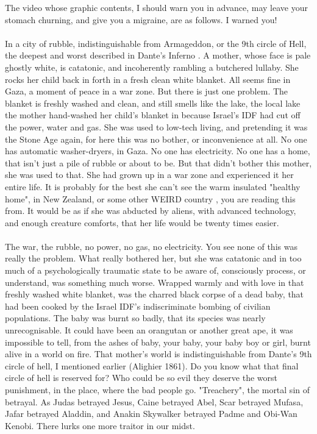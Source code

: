 \documentclass[16pt,openany,oneside]{book}
\begin{document}
The video whose graphic contents, I should warn you in advance, may leave your stomach churning, and give you a migraine, are as follows. I warned you!
\\\\
In a city of rubble, indistinguishable from Armageddon, or the 9th circle of Hell, the deepest and worst described in Dante's Inferno \cite{dante1861inferno}. A mother, whose face is pale ghostly white, is catatonic, and incoherently rambling a butchered lullaby. She rocks her child back in forth in a fresh clean white blanket. All seems fine in Gaza, a moment of peace in a war zone. But there is just one problem. The blanket is freshly washed and clean, and still smells like the lake, the local lake the mother hand-washed her child's blanket in because Israel's IDF had cut off the power, water and gas. She was used to low-tech living, and pretending it was the Stone Age again, for here this was no bother, or inconvenience at all. No one has automatic washer-dryers, in Gaza. No one has electricity. No one has a home, that isn't just a pile of rubble or about to be. But that didn't bother this mother, she was used to that. She had grown up in a war zone and experienced it her entire life. It is probably for the best she can't see the warm insulated "healthy home", in New Zealand, or some other WEIRD country \cite{muthukrishna2020beyondweird}, you are reading this from. It would be as if she was abducted by aliens, with advanced technology, and enough creature comforts, that her life would be twenty times easier.
\\\\
The war, the rubble, no power, no gas, no electricity. You see none of this was really the problem. What really bothered her, but she was catatonic and in too much of a psychologically traumatic state to be aware of, consciously process, or understand, was something much worse. Wrapped warmly and with love in that freshly washed white blanket, was the charred black corpse of a dead baby, that had been cooked by the Israel IDF's indiscriminate bombing of civilian populations. The baby was burnt so badly, that its species was nearly unrecognisable. It could have been an orangutan or another great ape, it was impossible to tell, from the ashes of baby, your baby, your baby boy or girl, burnt alive in a world on fire. That mother's world is indistinguishable from Dante's 9th circle of hell, I mentioned earlier (Alighier 1861). Do you know what that final circle of hell is reserved for? Who could be so evil they deserve the worst punishment, in the place, where the bad people go. "Treachery", the mortal sin of betrayal. As Judas betrayed Jesus, Caine betrayed Abel, Scar betrayed Mufasa, Jafar betrayed Aladdin, and Anakin Skywalker betrayed Padme and Obi-Wan Kenobi. There lurks one more traitor in our midst. 
\end{document}
